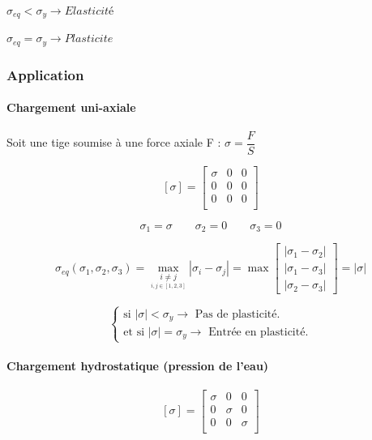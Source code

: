 \documentclass[12pt,a4paper]{report}
\begin{document}
	\vspace{\baselineskip}
	
	$\sigma_{eq} < \sigma_{y} \rightarrow Elasticité$
	
	$\sigma_{eq}  =  \sigma_{y} \rightarrow Plasticite$
	
	
	\subsubsection{Application}
	
	
	\paragraph{Chargement uni-axiale}
	
	Soit une tige soumise à une force axiale F : $\sigma = \dfrac{F}{S}$ 
	
	\[ [\sigma] = \begin{bmatrix}
		\sigma & 0 & 0 \\
		0&0&0\\
		0&0&0\\
	\end{bmatrix} \]
	
	\[ \sigma_{1} = \sigma \qquad \sigma_{2} = 0 \qquad \sigma_{3} = 0 \]
	
	\[ \sigma_{eq}(\sigma_{1},\sigma_{2},\sigma_{3}) = \underset{\underset{i,j \in [1,2,3]}{i\neq j}}{\max} |\sigma_{i} - \sigma_{j}| = 
	\max \begin{bmatrix}
		|\sigma_{1} - \sigma_{2}|\\
		|\sigma_{1} - \sigma_{3}|\\
		|\sigma_{2} - \sigma_{3}|
	\end{bmatrix} 
	= |\sigma|  \]
	
	\[ \begin{cases}
		\text{si } |\sigma| < \sigma_{y} \rightarrow \text{ Pas de plasticité.}\\
		\text{et si } |\sigma| = \sigma_{y} \rightarrow \text{ Entrée en plasticité.}
	\end{cases} \]
	
	\vspace{\baselineskip}
	
	
	
	
	\paragraph{Chargement hydrostatique (pression de l'eau)}
	
	
	\[ [\sigma] = \begin{bmatrix}
		\sigma & 0 & 0 \\
		0&\sigma&0\\
		0&0&\sigma\\
	\end{bmatrix} \]
	
\end{document}
